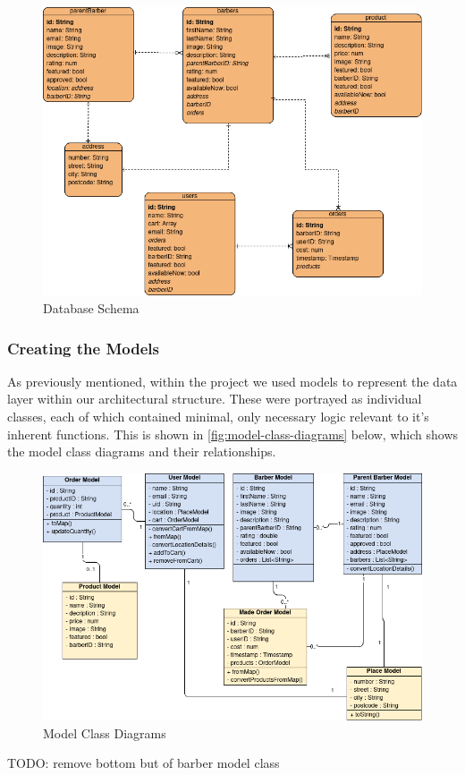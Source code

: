 \documentclass[12pt]{article}
\begin{document}
	\begin{figure}[H]
		\centering
		\includegraphics[scale=0.6]{images/database-schema.png}
		\caption{Database Schema}
		\label{fig:database-schema}
	\end{figure}

	\subsubsection{Creating the Models}
	As previously mentioned, within the project we used models to represent the data layer within our architectural structure. These were portrayed as individual classes, each of which contained minimal, only necessary logic relevant to it's inherent functions. This is shown in \autoref{fig:model-class-diagrams} below, which shows the model class diagrams and their relationships.
	
	\begin{figure}[H]
		\centering
		\includegraphics[scale=0.6]{images/model-class-diagrams.png}
		\caption{Model Class Diagrams}
		\label{fig:model-class-diagrams}
	\end{figure}
	TODO: remove bottom but of barber model class
\end{document}
